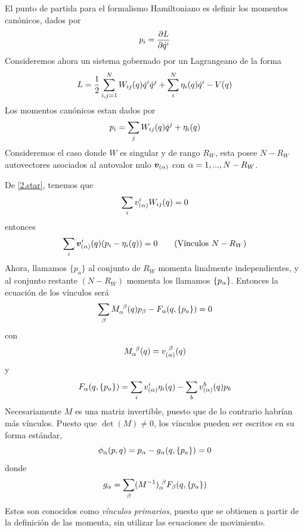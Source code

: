 El punto de partida para el formalismo Hamiltoniano es definir los momentos canónicos, dados por
\begin{equation}
  p_i=\pdv{L}{\dot{q}^{i}}
\end{equation}
Consideremos ahora un sistema gobernado por un Lagrangeano de la forma
\begin{equation}
  L=\frac{1}{2}\sum_{i,j=1}^NW_{ij}(q)\dot{q}^{i}\dot{q}^{j}+\sum_i^N\eta_i(q)\dot{q}^{i}-V(q)
\end{equation}
Los momentos canónicos estan dados por
\begin{equation}\label{2.star}
  p_i=\sum_{j}W_{ij}(q)\dot{q}^j+\eta_i(q)
\end{equation}
Consideremos el caso donde $W$ es singular y de rango $R_W$, esta posee $N-R_W$ autovectores asociados al autovalor nulo $\vb*{v}_{(\alpha) }$ con $\alpha=1,...,N-R_W$.

De \eqref{2.star}, tenemos que
\begin{equation}
  \sum_i v_{(\alpha) }^{i}W_{ij}(q)=0
\end{equation}
entonces
\begin{equation}
  \sum_i \vb*{v}_{(\alpha) }^{i}(q)(p_i-\eta_i(q))=0\qquad (\text{Vínculos $N-R_W$})
\end{equation}
Ahora, llamamos $\{p_a\}$ al conjunto de $R_W$ momenta linalmente independientes, y al conjunto restante $(N-R_W)$ momenta los llamamos $\{p_\alpha \}$. Entonces la ecuación de los vínculos será
\begin{equation}
  \sum_\beta M_\alpha ^{~\beta }(q)p_\beta -F_\alpha (q,\{p_a\})=0
\end{equation}
con
\begin{equation}
  M_\alpha ^{~\beta }(q)=v_{(\alpha )}^{~\beta }(q)
\end{equation}
y
\begin{equation}
  F_\alpha (q,\{p_a\}) =\sum_i v_{(\alpha )}^{i }\eta_i(q)-\sum_bv_{(\alpha )}^{b }(q)p_b
\end{equation}
Necesariamente $M$ es una matriz invertible, puesto que de lo contrario habrían más vínculos. 
Puesto que $\det(M)\neq 0$, los vínculos pueden ser escritos en su forma estándar,
\begin{equation}
  \phi_\alpha (p,q)=p_\alpha -g_\alpha (q,\{p_a\})=0
\end{equation}
donde
\begin{equation}
  g_\alpha =\sum_\beta (M^{-1})_\alpha ^{~\beta }F_\beta (q,\{p_a\})
\end{equation}
Estos son conocidos como \textit{vínculos primarios}, puesto que se obtienen a partir de la definición de las momenta, sin utilizar las ecuaciones de movimiento.

